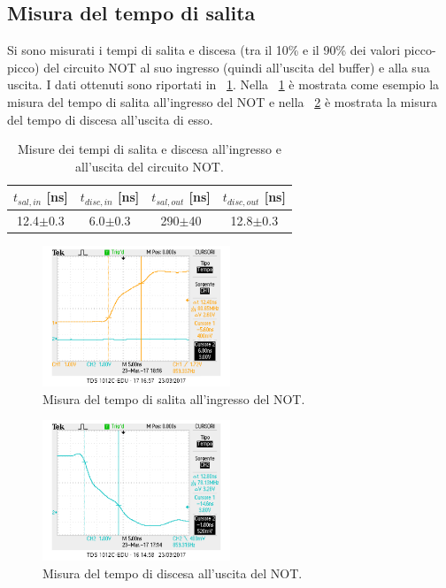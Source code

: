 \documentclass[a4paper,10pt]{article}
\begin{document}
{\subsection{Misura del tempo di salita}
Si sono misurati i tempi di salita e discesa (tra il 10\% e il 90\% dei valori picco-picco) del circuito NOT al suo ingresso (quindi all'uscita del buffer) e alla sua uscita. I dati ottenuti sono riportati in \tablename{~\ref{tab:tsaldisc}}. Nella \figurename{~\ref{fig:temposalita1input}} è mostrata come esempio la misura del tempo di salita all'ingresso del NOT e nella \figurename{~\ref{fig:tempodiscesa}} è mostrata la misura del tempo di discesa all'uscita di esso.

\begin{table}[H]
	\centering
	\begin{tabular}{c|c|c|c}
	$t_{sal,in}$ [ns] & $t_{disc,in}$ [ns] & $t_{sal,out}$ [ns] & $t_{disc,out}$ [ns]\\
	\hline
	12.4$\pm$0.3 & 6.0$\pm$0.3 & 290$\pm$40 &12.8$\pm$0.3\\
	\hline
	\end{tabular}
	\caption{Misure dei tempi di salita e discesa all'ingresso e all'uscita del circuito NOT.}
	\label{tab:tsaldisc}
\end{table}


\begin{figure}[H]
	\centering
	\includegraphics[width=0.5\textwidth]{../grafici/temposalita1input.png}
	\caption{Misura del tempo di salita all'ingresso del NOT.}
	\label{fig:temposalita1input}
\end{figure}

\begin{figure}[H]
	\centering
	\includegraphics[width=0.5\textwidth]{../grafici/tempodiscesa.png}
	\caption{Misura del tempo di discesa all'uscita del NOT.}
	\label{fig:tempodiscesa}
\end{figure}

}
\end{document}
